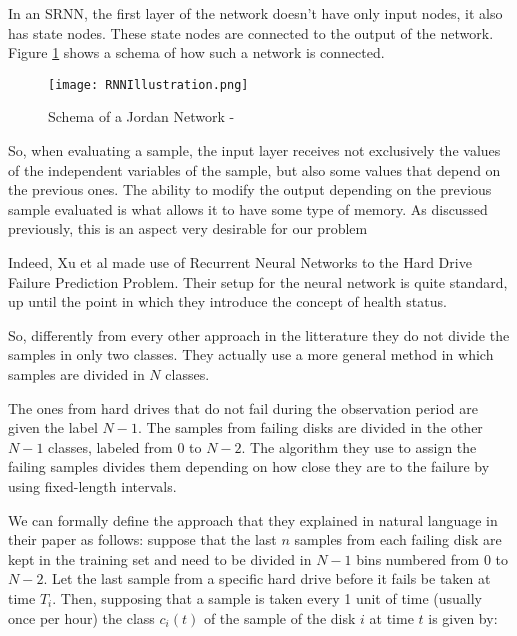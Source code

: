 In an SRNN, the first layer of the network doesn't have only input nodes, it also has state nodes.
These state nodes are connected to the output of the network.
Figure \ref{fig:RNNIllustration} shows a schema of how such a network is connected.

\begin{figure}
    \begin{center}
        \texttt{[image: RNNIllustration.png]}
        \caption[Schema of a Jordan Network]{Schema of a Jordan Network - \cite{elman1990finding}}
        \label{fig:RNNIllustration}
    \end{center}
\end{figure}

So, when evaluating a sample, the input layer receives not exclusively the values of the independent variables of the sample, but also some values that depend on the previous ones.
The ability to modify the output depending on the previous sample evaluated is what allows it to have some type of memory.
As discussed previously, this is an aspect very desirable for our problem

Indeed, Xu et al \cite{Xu16} made use of Recurrent Neural Networks to the Hard Drive Failure Prediction Problem.
Their setup for the neural network is quite standard, up until the point in which they introduce the concept of health status.

So, differently from every other approach in the litterature they do not divide the samples in only two classes.
They actually use a more general method in which samples are divided in $N$ classes.

The ones from hard drives that do not fail during the observation period are given the label $N-1$.
The samples from failing disks are divided in the other $N-1$ classes, labeled from $0$ to $N-2$.
The algorithm they use to assign the failing samples divides them depending on how close they are to the failure by using fixed-length intervals.

We can formally define the approach that they explained in natural language in their paper as follows:
suppose that the last $n$ samples from each failing disk are kept in the training set and need to be divided in $N-1$ bins numbered from 0 to $N-2$.
Let the last sample from a specific hard drive before it fails be taken at time $T_i$.
Then, supposing that a sample is taken every 1 unit of time (usually once per hour) the class $c_i(t)$ of the sample of the disk $i$ at time $t$ is given by:

